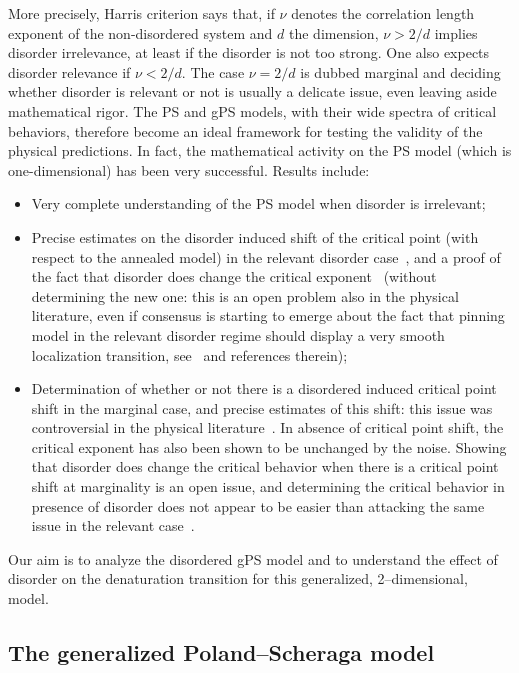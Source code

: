 More precisely, Harris criterion says that, if $\nu$ denotes the correlation length exponent of the non-disordered system and $d $ the dimension, $\nu >2/d$ implies disorder irrelevance, at least if the disorder is not too strong. One also expects disorder relevance if $\nu< 2/d$. The case $\nu= 2/d$ is dubbed marginal and deciding whether disorder is relevant or not is usually a delicate issue, even leaving aside mathematical rigor. The PS and gPS models, with their wide spectra of critical behaviors, therefore become an ideal framework for testing the validity of the physical predictions. In fact, the mathematical activity on the PS model (which is one-dimensional) has been very successful. Results include:
\begin{itemize}
\item Very complete understanding of the PS model when disorder is irrelevant\linebreak\cite{cf:A08,cf:G,cf:Lac,cf:Ton08};
\item Precise estimates on the disorder induced shift of the critical point (with respect to the annealed model) in the relevant disorder case~\cite{cf:AZ09,cf:DGLT09}, and a proof of the fact that disorder does change the critical exponent~\cite{cf:CH13,cf:GT06} (without determining the new one: this is an open problem also in the physical literature, even if consensus is starting to emerge about the fact that pinning model in the relevant disorder regime should display a very smooth localization transition, see~\cite{cf:BGL,cf:DR} and references therein);
\item Determination of whether or not there is a disordered induced critical point shift in the marginal case, and precise estimates of this shift: this issue was controversial in the physical literature~\cite{cf:BL16,cf:1GLT10}. In absence of critical point shift, the critical exponent has also been shown to be unchanged by the noise. Showing that disorder does change the critical behavior when there is a critical point shift at marginality is an open issue, and determining the critical behavior in presence of disorder does not appear to be easier than attacking the same issue in the relevant case~\cite{cf:DR}.
\end{itemize}

Our aim is to analyze the disordered gPS model and to understand the effect of disorder on the denaturation transition for this generalized, 2--dimensional, model.

\subsection{The generalized Poland--Scheraga model}\label{sec:model}

